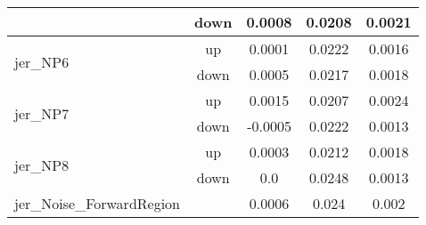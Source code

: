 \begin{table}[h!]
\begin{tabular}{lcccc}
                                       & down &     0.0008     &     0.0208     &     0.0021       \\ \hline
\multirow{2}{*}{jer\_NP6}      & up   &     0.0001     &     0.0222     &     0.0016      \\
                                       & down &     0.0005     &     0.0217     &     0.0018       \\ \hline
\multirow{2}{*}{jer\_NP7}      & up   &     0.0015     &     0.0207     &     0.0024      \\
                                       & down &     -0.0005     &     0.0222     &     0.0013       \\ \hline
\multirow{2}{*}{jer\_NP8}      & up   &     0.0003     &     0.0212     &     0.0018      \\
                                       & down &     0.0     &     0.0248     &     0.0013       \\ \hline
\multirow{2}{*}{jer\_Noise\_ForwardRegion}  &  & \multirow{2}{*}{0.0006} & \multirow{2}{*}{0.024}  & \multirow{2}{*}{0.002}  \\  \\ \hline

\end{tabular}

\label{tab:systUnc_lep_fr}
\end{table}


